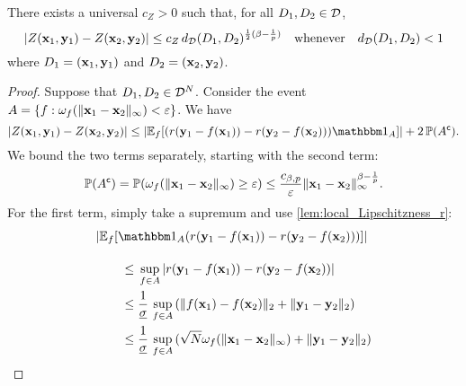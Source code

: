 \documentclass[12pt, twoside]{report}
\begin{document}
\begin{proposition} \label{prop:Lipschitzness_Z}
    There exists a universal $c_Z > 0$ such that, for all $D_1, D_2 \in \mathcal{D}$,
    \begin{equation}
        \lvert Z(\mathbf{x}_1, \mathbf{y}_1) - Z(\mathbf{x}_2, \mathbf{y}_2)\rvert
        \le c_Z\, d_{\mathcal{D}}(D_1, D_2)^{\frac12(\beta - \frac1p)}
        \quad\text{whenever}\quad
        d_{\mathcal{D}}(D_1,D_2) < 1
    \end{equation}
    where $D_1 = (\mathbf{x}_1, \mathbf{y}_1)$ and $D_2 = (\mathbf{x}_2, \mathbf{y}_2)$.
\end{proposition}
\begin{proof}
    Suppose that $D_1, D_2 \in \mathcal{D}^N$.
    Consider the event $A = \{f : 
        \omega_f(\lVert\mathbf{x}_1 - \mathbf{x}_2\rVert_\infty) < \varepsilon
    \}$.
    We have
    \begin{equation}
        \abs{Z(\vx_1, \vy_1) - Z(\vx_2, \vy_2)}
         \le 
            \abs{\E_f[
                (
                    r(\vy_1 - f(\vx_1)) 
                    - r(\vy_2 - f(\vx_2)) 
                ) \ind_A
            ]}
            + 2\, \P(A^\c).
    \end{equation}
    We bound the two terms separately, starting with the second term:
    \begin{equation}
        \P(A^\c)
        =
            \P(\omega_f(\norm{\vx_1 - \vx_2}_\infty) \ge \e)
        \le 
        \frac{c_{\beta, p}}{\e} \norm{\vx_1 - \vx_2}_\infty^{\beta - \frac{1}{p}}.
    \end{equation}
    For the first term, simply take a supremum and use \cref{lem:local_Lipschitzness_r}:
    \begin{align}
        &\abs{\E_f[
            \ind_A
            (
                r(\vy_1 - f(\vx_1)) 
                - r(\vy_2 - f(\vx_2)) 
            ) 
        ]}
        \vphantom{\frac{}{\underline{\sigma}}}
        \nonumber \\
        &\qquad \le 
            \vphantom{\frac{1}{\underline{\sigma}}}
            \sup_{f \in A} \, 
                \abs{
                    r(\vy_1 - f(\vx_1)) 
                    - r(\vy_2 - f(\vx_2)) 
                } \\
        &\qquad \le 
            \frac{1}{\underline{\sigma}}\, \sup_{f \in A} \, 
                (\norm{f(\vx_1) - f(\vx_2)}_2 + \norm{\vy_1 - \vy_2}_2) \\
        &\qquad \le 
            \frac{1}{\underline{\sigma}}\, \sup_{f \in A} \, 
                (\sqrt{N}\omega_f(\norm{\vx_1 - \vx_2}_\infty) + \norm{\vy_1 - \vy_2}_2) \\

\end{align}
\end{proof}
\end{document}
